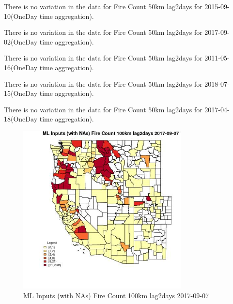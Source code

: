 There is no variation in the data for Fire Count 50km lag2days for 2015-09-10(OneDay time aggregation). 
 

There is no variation in the data for Fire Count 50km lag2days for 2017-09-02(OneDay time aggregation). 
 

There is no variation in the data for Fire Count 50km lag2days for 2011-05-16(OneDay time aggregation). 
 

There is no variation in the data for Fire Count 50km lag2days for 2018-07-15(OneDay time aggregation). 
 

There is no variation in the data for Fire Count 50km lag2days for 2017-04-18(OneDay time aggregation). 
 

\clearpage 

\begin{figure} 
\centering  
\includegraphics[width=0.77\textwidth]{Code_Outputs/Report_ML_input_PM25_Step4_part_e_de_duplicated_aves_compiled_2019-05-21wNAs_CountyFire_Count_100km_lag2daysMean2017-09-07.jpg} 
\caption{\label{fig:Report_ML_input_PM25_Step4_part_e_de_duplicated_aves_compiled_2019-05-21wNAsCountyFire_Count_100km_lag2daysMean2017-09-07}ML Inputs (with NAs) Fire Count 100km lag2days 2017-09-07} 
\end{figure} 
 

